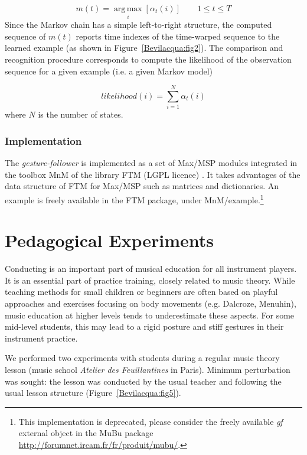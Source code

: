 \begin{equation}
m(t)=\operatorname*{arg\,max}_i [\alpha_t(i)]\qquad 1 \leq t \leq T
\end{equation}
% 
Since the Markov chain has a simple left-to-right structure, the computed sequence of $m(t)$ reports time indexes of the time-warped sequence to the learned example (as shown in Figure~\ref{Bevilacqua:fig2}). 
The comparison and recognition procedure corresponds to compute the likelihood of the observation sequence for a given example (i.e. a given Markov model)

\begin{equation}
likelihood(i) = \sum_{i=1}^{N}\alpha_t(i)
\end{equation}
where $N$ is the number of states.

\subsubsection{Implementation}
The \emph{gesture-follower} is implemented as a set of Max/MSP modules integrated in the toolbox MnM \cite{Bevilacqua:2005} of the library FTM (LGPL licence) \cite{Schnell:2005a}. It takes advantages of the data structure of FTM for Max/MSP such as matrices and dictionaries. An example is freely available in the FTM package, under MnM/example.\footnote{This implementation is deprecated, please consider the freely available \emph{gf} external object in the MuBu package \url{http://forumnet.ircam.fr/fr/produit/mubu/}.}

\section{Pedagogical Experiments}
Conducting is an important part of musical education for all instrument players. It is an essential part of practice training, closely related to music theory. While teaching methods for small children or beginners are often based on playful approaches and exercises focusing on body movements (e.g. Dalcroze, Menuhin), music education at higher levels tends to underestimate these aspects. For some mid-level students, this may lead to a rigid posture and stiff gestures in their instrument practice. 

We performed two experiments with students during a regular music theory lesson (music school \emph{Atelier des Feuillantines} in Paris). Minimum perturbation was sought: the lesson was conducted by the usual teacher and following the usual lesson structure (Figure~\ref{Bevilacqua:fig5}). 

